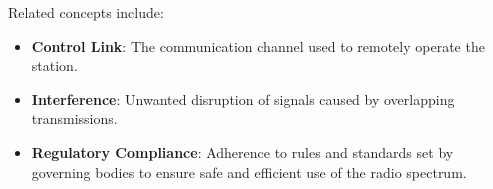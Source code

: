 Related concepts include:
\begin{itemize}
    \item \textbf{Control Link}: The communication channel used to remotely operate the station.
    \item \textbf{Interference}: Unwanted disruption of signals caused by overlapping transmissions.
    \item \textbf{Regulatory Compliance}: Adherence to rules and standards set by governing bodies to ensure safe and efficient use of the radio spectrum.
\end{itemize}

